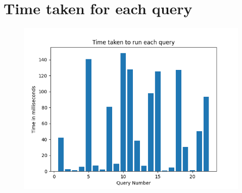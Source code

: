 \documentclass{exam}
\begin{document}
\section{Time taken for each query}
\begin{figure}[h]
\centering
\includegraphics[scale=1.0]{query.png}
\end{figure}
\end{document}
